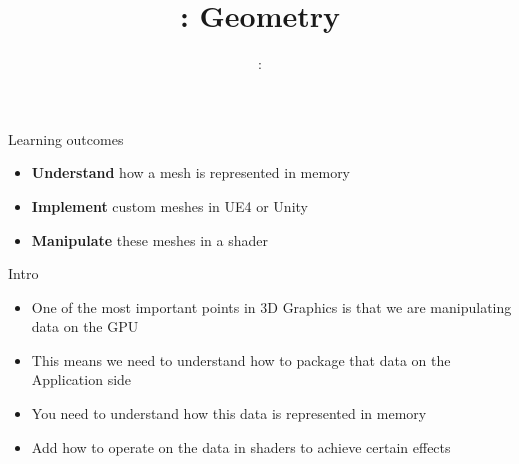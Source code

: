 \usepackage{../../beamerthemeFalmouthGamesAcademy}
\usepackage{multimedia}
\graphicspath{ {../../} }


\usepackage[normalem]{ulem}
\usepackage{wasysym}

\usepackage{pdfpages}

\usetikzlibrary{arrows,automata}




\title{\sessionnumber: Geometry}
\subtitle{\modulecode: \moduletitle}

\frame{\titlepage} 

\begin{frame}{Learning outcomes}
	\begin{itemize}
		\item \textbf{Understand} how a mesh is represented in memory
		\item \textbf{Implement} custom meshes in UE4 or Unity
		\item \textbf{Manipulate} these meshes in a shader
	\end{itemize}
\end{frame}

\begin{frame}{Intro}
	\begin{itemize}
		\item One of the most important points in 3D Graphics is that we are manipulating data on the GPU
		\pause\item This means we need to understand how to package that data on the Application side
		\pause\item You need to understand how this data is represented in memory
		\pause\item Add how to operate on the data in shaders to achieve certain effects
	\end{itemize}
\end{frame}










